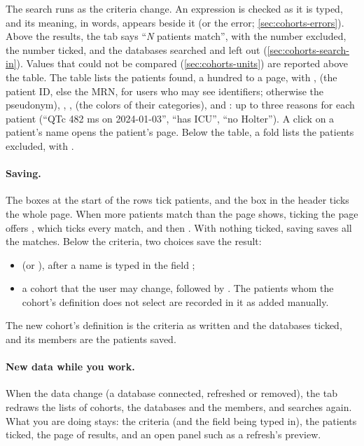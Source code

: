 The search runs as the criteria change. An expression is checked as it is typed, and its
meaning, in words, appears beside it (or the error; \cref{sec:cohorts-errors}). Above the
results, the tab says ``\emph{N} patients match'', with the number excluded, the number
ticked, and the databases searched and left out (\cref{sec:cohorts-search-in}). Values that
could not be compared (\cref{sec:cohorts-units}) are reported above the table. The table lists
the patients found, a hundred to a page, with ,  (the patient ID, else the
MRN, for users who may see identifiers; otherwise the pseudonym), , ,
 (the colors of their categories), and : up to three reasons for each patient
(``QTc 482 ms on 2024-01-03'', ``has ICU'', ``no Holter''). A click on a patient's name opens the patient's page. Below the table, a fold
lists the patients excluded, with .

\paragraph{Saving.} The boxes at the start of the rows tick patients, and the box in the header
ticks the whole page. When more patients match than the page shows, ticking the page offers
, which ticks every match, and then . With nothing ticked,
saving saves all the matches. Below the criteria, two choices save the result:
\begin{itemize}
\item {} (or ),
  after a name is typed in the field ;
\item {} a cohort that the user may change, followed by . The patients
  whom the cohort's definition does not select are recorded in it as added manually.
\end{itemize}
The new cohort's definition is the criteria as written and the databases ticked, and its
members are the patients saved.

\paragraph{New data while you work.} When the data change (a database connected, refreshed or
removed), the tab redraws the lists of cohorts, the databases and the members, and searches
again. What you are doing stays: the criteria (and the field being typed in), the patients
ticked, the page of results, and an open panel such as a refresh's preview.


